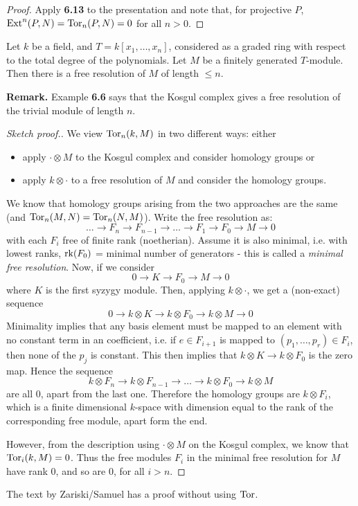 \documentclass[10pt,a4paper]{article}
\begin{document}
\begin{proof}
  Apply \textbf{6.13} to the presentation and note that, for projective $P$, $\operatorname{Ext}^n(P,N) = \operatorname{Tor}_n(P,N) = 0$ for all $n >0$.
\end{proof}
\begin{theorem}
  Let $k$ be a field, and $T = k[x_1, \ldots, x_n]$, considered as a graded ring with respect to the total degree of the polynomials. Let $M$ be a finitely generated $T$-module. Then there is a free resolution of $M$ of length $\leq n$.
\end{theorem}
\textbf{Remark.} Example \textbf{6.6} says that the Kosgul complex gives a free resolution of the trivial module of length $n$.
\begin{proof}[Sketch proof.]
  We view $\operatorname{Tor}_n(k, M)$ in two different ways: either
  \begin{itemize}
    \item apply $\cdot \otimes M$ to the Kosgul complex and consider homology groups or
    \item apply $k \otimes \cdot$ to a free resolution of $M$ and consider the homology groups.
  \end{itemize}
  We know that homology groups arising from the two approaches are the same (and $\operatorname{Tor}_n(M,N) = \operatorname{Tor}_n(N,M)$). Write the free resolution as:
  \[\ldots \to F_n \to F_{n-1} \to \ldots \to F_1 \to F_0 \to M \to 0\]
  with each $F_i$ free of finite rank (noetherian). Assume it is also minimal, i.e. with lowest ranks, $\operatorname{rk}(F_0)$ = minimal number of generators - this is called a \emph{minimal free resolution}. Now, if we consider
  \[0 \to K \to F_0 \to M \to 0\]
  where $K$ is the first syzygy module. Then, applying $k \otimes \cdot$, we get a (non-exact) sequence
  \[0 \to k \otimes K \to k \otimes F_0 \to k \otimes M \to 0\]
  Minimality implies that any basis element must be mapped to an element with no constant term in an coefficient, i.e. if $e \in F_{i+1}$ is mapped to $(p_1, \ldots, p_r) \in F_i$, then none of the $p_j$ is constant. This then implies that $k \otimes K \to k \otimes F_0$ is the zero map. Hence the sequence
  \[k \otimes F_n \to k \otimes F_{n-1} \to \ldots \to k \otimes F_0 \to k \otimes M\]
  are all $0$, apart from the last one. Therefore the homology groups are $k \otimes F_i$, which is a finite dimensional $k$-space with dimension equal to the rank of the corresponding free module, apart form the end.

  However, from the description using $\cdot \otimes M$ on the Kosgul complex, we know that $\operatorname{Tor}_i(k, M) = 0$. Thus the free modules $F_i$ in the minimal free resolution for $M$ have rank $0$, and so are $0$, for all $i > n$.
\end{proof}
The text by Zariski/Samuel has a proof without using $\operatorname{Tor}$.
\end{document}
